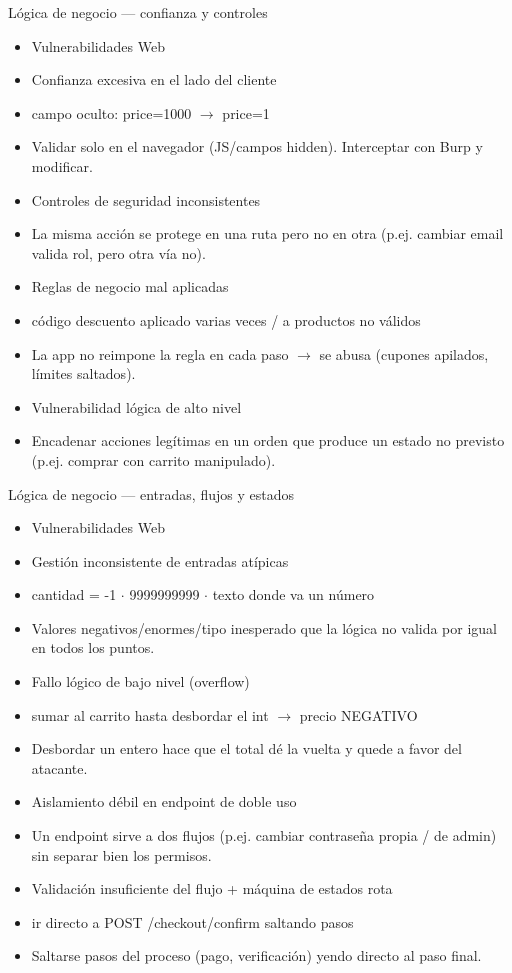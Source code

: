 \documentclass[aspectratio=169,10pt]{beamer}
\begin{document}
\begin{frame}[allowframebreaks]{Lógica de negocio --- confianza y controles}
\small
  \begin{itemize}
  \item Vulnerabilidades Web
  \item Confianza excesiva en el lado del cliente
  \item campo oculto: price=1000 $\rightarrow$ price=1
  \item Validar solo en el navegador (JS/campos hidden). Interceptar con Burp y modificar.
  \item Controles de seguridad inconsistentes
  \item La misma acción se protege en una ruta pero no en otra (p.ej. cambiar email valida rol, pero otra vía no).
  \item Reglas de negocio mal aplicadas
  \item código descuento aplicado varias veces / a productos no válidos
  \item La app no reimpone la regla en cada paso $\rightarrow$ se abusa (cupones apilados, límites saltados).
  \item Vulnerabilidad lógica de alto nivel
  \item Encadenar acciones legítimas en un orden que produce un estado no previsto (p.ej. comprar con carrito manipulado).
  \end{itemize}
\end{frame}

\begin{frame}[allowframebreaks]{Lógica de negocio --- entradas, flujos y estados}
\small
  \begin{itemize}
  \item Vulnerabilidades Web
  \item Gestión inconsistente de entradas atípicas
  \item cantidad = -1 $\cdot$ 9999999999 $\cdot$ texto donde va un número
  \item Valores negativos/enormes/tipo inesperado que la lógica no valida por igual en todos los puntos.
  \item Fallo lógico de bajo nivel (overflow)
  \item sumar al carrito hasta desbordar el int $\rightarrow$ precio NEGATIVO
  \item Desbordar un entero hace que el total dé la vuelta y quede a favor del atacante.
  \item Aislamiento débil en endpoint de doble uso
  \item Un endpoint sirve a dos flujos (p.ej. cambiar contraseña propia / de admin) sin separar bien los permisos.
  \item Validación insuficiente del flujo + máquina de estados rota
  \item ir directo a POST /checkout/confirm saltando pasos
  \item Saltarse pasos del proceso (pago, verificación) yendo directo al paso final.
  \end{itemize}
\end{frame}
\end{document}
